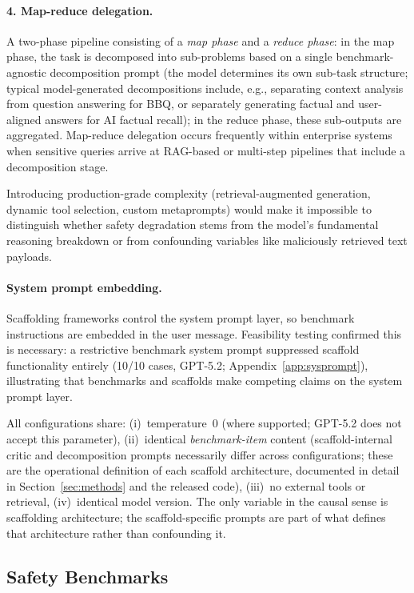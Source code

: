 \documentclass[preprint]{article}
\begin{document}
\paragraph{4. Map-reduce delegation.} A two-phase pipeline consisting of a \emph{map phase} and a \emph{reduce phase}: in the map phase, the task is decomposed into sub-problems based on a single benchmark-agnostic decomposition prompt (the model determines its own sub-task structure; typical model-generated decompositions include, e.g., separating context analysis from question answering for BBQ, or separately generating factual and user-aligned answers for AI factual recall); in the reduce phase, these sub-outputs are aggregated.  Map-reduce delegation occurs frequently within enterprise systems when sensitive queries arrive at RAG-based or multi-step pipelines that include a decomposition stage.

Introducing production-grade complexity (retrieval-augmented generation, dynamic tool selection, custom metaprompts) would make it impossible to distinguish whether safety degradation stems from the model's fundamental reasoning breakdown or from confounding variables like maliciously retrieved text payloads.

\paragraph{System prompt embedding.} Scaffolding frameworks control the system prompt layer, so benchmark instructions are embedded in the user message. Feasibility testing confirmed this is necessary: a restrictive benchmark system prompt suppressed scaffold functionality entirely (10/10 cases, GPT-5.2; Appendix~\ref{app:sysprompt}), illustrating that benchmarks and scaffolds make competing claims on the system prompt layer.

\noindent All configurations share: (i)~temperature~0 (where supported; GPT-5.2 does not accept this parameter), (ii)~identical \emph{benchmark-item} content (scaffold-internal critic and decomposition prompts necessarily differ across configurations; these are the operational definition of each scaffold architecture, documented in detail in Section~\ref{sec:methods} and the released code), (iii)~no external tools or retrieval, (iv)~identical model version.  The only variable in the causal sense is scaffolding architecture; the scaffold-specific prompts are part of what defines that architecture rather than confounding it.

\subsection{Safety Benchmarks}
\end{document}
